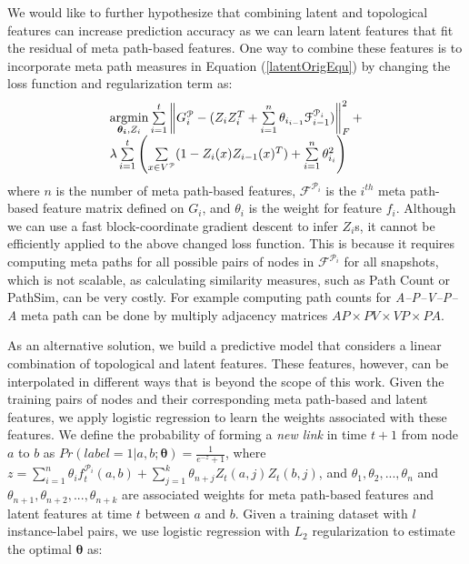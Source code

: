 We would like to further hypothesize that combining latent and topological features can increase prediction accuracy as we can learn latent features that fit the residual of meta path-based features. One way to combine these features is to incorporate meta path measures in Equation (\ref{latentOrigEqu}) by changing the loss function and regularization term as:
\begin{equation}\label{latentMetaEqu}
    \begin{array}{l}
\operatorname*{argmin}\limits_{\boldsymbol{\theta_i},Z_i}\sum\limits_{i=1}^{t}\left \| G^\mathcal{P}_i - (Z_{i}Z_{i}^T + \sum\limits_{i=1}^{n}\theta_{i_{i-1}} \mathcal{F}^{\mathcal{P}_i}_{i-1}) \right \|^2_F+
\\ 
\lambda \sum\limits_{i=1}^{t}\left(\sum\limits_{x \in V^\mathcal{P}}(1-Z_{i}(x)Z_{i-1}(x)^T) + \sum\limits_{i=1}^{n} \theta_{i_i}^2\right)\\
    \end{array}
\end{equation}
where $n$ is the number of meta path-based features, $\mathcal{F}^{\mathcal{P}_i}$ is the $i^{th}$ meta path-based feature matrix defined on $G_i$, and $\theta_i$ is the weight for feature $f_i$. Although we can use a fast block-coordinate gradient descent \cite{Zhu2016} to infer $Z_i$s, it cannot be efficiently applied to the above changed loss function. This is because it requires computing meta paths for all possible pairs of nodes in $\mathcal{F}^{\mathcal{P}_i}$ for all snapshots, which is not scalable, as calculating similarity measures, such as Path Count or PathSim, can be very costly. For example computing path counts for \textit{A--P--V--P--A} meta path can be done by multiply adjacency matrices $AP\times PV\times VP\times PA$. 


As an alternative solution, we build a predictive model that considers a linear combination of topological and latent features. These features, however, can be interpolated in different ways that is beyond the scope of this work. Given the training pairs of nodes and their corresponding meta path-based and latent features, we apply logistic regression to learn the weights associated with these features. We define the probability of forming a \textit{new link} in time $t+1$ from node $a$ to $b$ as %
 $Pr(label=1|a, b; \boldsymbol{\theta}) = \frac{1}{e^{-z}+1}$, where $z=\sum\limits_{i=1}^{n}\theta_i f_t^{\mathcal{P}_i}(a,b) + \sum\limits_{j=1}^{k} \theta_{n+j}Z_t(a,j)Z_t(b,j)$, and $\theta_1,\theta_2,..., \theta_n$ and $\theta_{n+1},\theta_{n+2},..., \theta_{n+k}$ are associated weights for meta path-based features and latent features at time $t$ between $a$ and $b$. Given a training dataset with $l$ instance-label pairs, we use logistic regression with $L_2$ regularization to estimate the optimal $\boldsymbol{\theta}$ as:%

